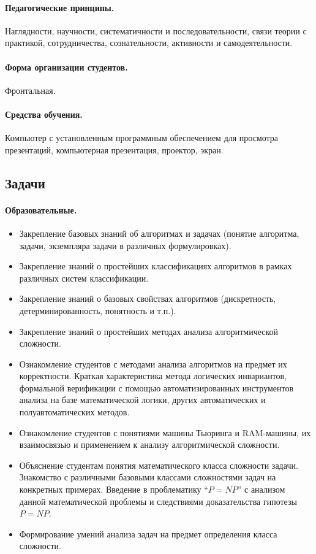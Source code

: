 \begin{refsection}
    \paragraph{Педагогические принципы.} Наглядности, научности, систематичности и последовательности, связи теории с практикой, сотрудничества, сознательности, активности и самодеятельности.

    \paragraph{Форма организации студентов.} Фронтальная.

    \paragraph{Средства обучения.} Компьютер с установленным программным обеспечением для просмотра презентаций, компьютерная презентация, проектор, экран.

\subsection{Задачи}

    \paragraph{Образовательные.} \begin{itemize}
        \item Закрепление базовых знаний об алгоритмах и задачах (понятие алгоритма, задачи, экземпляра задачи в различных формулировках).
        \item Закрепление знаний о простейших классификациях алгоритмов в рамках различных систем классификации.
        \item Закрепление знаний о базовых свойствах алгоритмов (дискретность, детерминированность, понятность и т.п.).
        \item Закрепление знаний о простейших методах анализа алгоритмической сложности.
        \item Ознакомление студентов с методами анализа алгоритмов на предмет их корректности. Краткая характеристика метода логических инвариантов, формальной верификации с помощью автоматизированных инструментов анализа на базе математической логики, других автоматических и полуавтоматических методов.
        \item Ознакомление студентов с понятиями машины Тьюринга и RAM-машины, их взаимосвязью и применением к анализу алгоритмической сложности.
        \item Объяснение студентам понятия математического класса сложности задачи. Знакомство с различными базовыми классами сложностями задач на конкретных примерах. Введение в проблематику \enquote{$P = NP$} с анализом данной математической проблемы и следствиями доказательства гипотезы $P = NP$.
        \item Формирование умений анализа задач на предмет определения класса сложности.
    \end{itemize}


\end{refsection}
